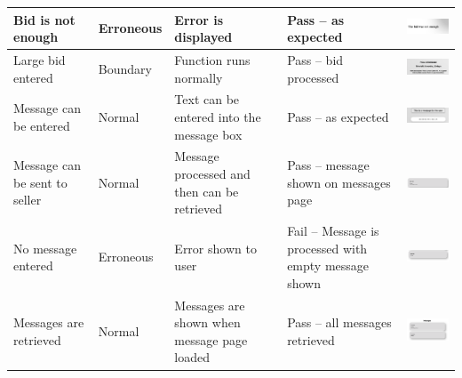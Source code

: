 \begin{center}
\begin{longtable}{|P{17mm}|P{17mm}|P{16mm}|P{17mm}|P{60mm}|}
Bid is not enough & Erroneous & Error is displayed & Pass -- as expected
&
\includegraphics[width=58mm]{ch3_developing/proto3/media/image30.png} \\ \hline
Large bid entered & Boundary & Function runs normally & Pass -- bid
processed &
\includegraphics[width=58mm]{ch3_developing/proto3/media/image31.png} \\ \hline
Message can be entered & Normal & Text can be entered into the message
box & Pass -- as expected &
\includegraphics[width=58mm]{ch3_developing/proto3/media/image32.png} \\ \hline
Message can be sent to seller & Normal & Message processed and then can
be retrieved & Pass -- message shown on messages page &
\includegraphics[width=58mm]{ch3_developing/proto3/media/image33.png} \\ \hline
No message entered & Erroneous & Error shown to user & Fail -- Message
is processed with empty message shown &
\includegraphics[width=58mm]{ch3_developing/proto3/media/image34.png} \\ \hline
Messages are retrieved & Normal & Messages are shown when message page
loaded & Pass -- all messages retrieved &
\includegraphics[width=58mm]{ch3_developing/proto3/media/image35.png} \\ \hline

\end{longtable}
\end{center}
